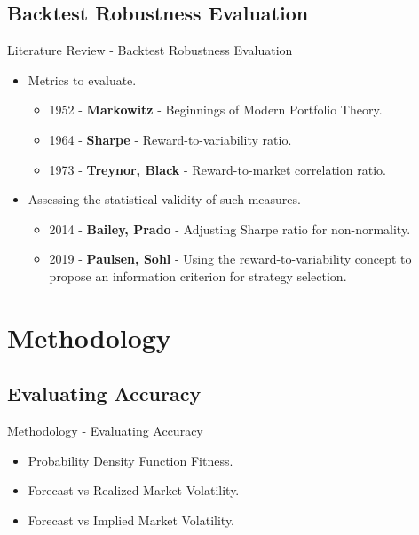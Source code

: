 \documentclass{beamer}
\begin{document}
\subsection{Backtest Robustness Evaluation}
\begin{frame}{Literature Review - Backtest Robustness Evaluation}
    \begin{itemize}
        \item Metrics to evaluate.
        \begin{itemize}
            \item   1952 - \textbf{Markowitz} - Beginnings of Modern Portfolio Theory.
            \item   1964 - \textbf{Sharpe} - Reward-to-variability ratio.
            \item   1973 - \textbf{Treynor, Black} - Reward-to-market correlation ratio.
        \end{itemize}
        \item Assessing the statistical validity of such measures.
        \begin{itemize}
            \item   2014 - \textbf{Bailey, Prado} - Adjusting Sharpe ratio for non-normality.
            \item   2019 - \textbf{Paulsen, Sohl} - Using the reward-to-variability concept to propose an information criterion for strategy selection.
        \end{itemize}
    \end{itemize}
\end{frame}

\section{Methodology}
\subsection{Evaluating Accuracy}
\begin{frame}{Methodology - Evaluating Accuracy}
    \begin{itemize}
        \item   Probability Density Function Fitness.
        \item   Forecast vs Realized Market Volatility.
        \item   Forecast vs Implied Market Volatility.
    \end{itemize}
\end{frame}
\end{document}
